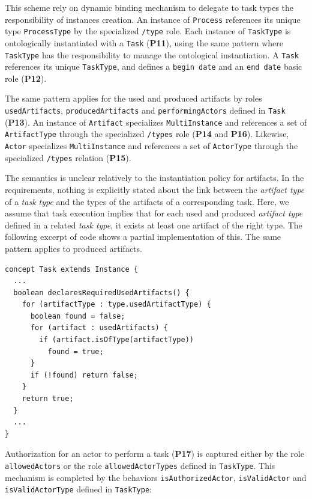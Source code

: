 This scheme rely on \FML dynamic binding mechanism to delegate to task types the responsibility of instances creation. An instance of \texttt{Process} references its unique type \texttt{ProcessType} by the specialized \texttt{/type} role. Each instance of \texttt{TaskType} is ontologically instantiated with a \texttt{Task} (\textbf{P11}), using the same pattern where \texttt{TaskType} has the responsibility to manage the ontological instantiation. A \texttt{Task} references its unique \texttt{TaskType}, and defines a \texttt{begin date} and an \texttt{end date} basic role (\textbf{P12}).

The same pattern applies for the used and produced artifacts by roles \texttt{usedArtifacts}, \texttt{producedArtifacts} and \texttt{performingActors} defined in \texttt{Task} (\textbf{P13}). An instance of \texttt{Artifact} specializes \texttt{MultiInstance} and references a set of \texttt{ArtifactType} through the specialized \texttt{/types} role (\textbf{P14} and \textbf{P16}). Likewise, \texttt{Actor} specializes \texttt{MultiInstance} and references a set of \texttt{ActorType} through the specialized \texttt{/types} relation (\textbf{P15}).

The semantics is unclear relatively to the instantiation policy for artifacts. In the requirements, nothing is explicitly stated about the link between the \emph{artifact type} of a \emph{task type} and the types of the artifacts of a corresponding task.
Here, we assume that task execution implies that for each used and produced \emph{artifact type} defined in a related \emph{task type}, it exists at least one artifact of the right type. The following excerpt of \FML code shows a partial implementation of this. The same pattern applies to produced artifacts.

\begin{lstlisting}
concept Task extends Instance {
  ...
  boolean declaresRequiredUsedArtifacts() {
    for (artifactType : type.usedArtifactType) {
      boolean found = false;
      for (artifact : usedArtifacts) {
        if (artifact.isOfType(artifactType))
          found = true;
      }
      if (!found) return false;
    }
    return true;
  }
  ...
}    
\end{lstlisting}

Authorization for an actor to perform a task (\textbf{P17}) is captured either by the role \texttt{allowedActors} or the role \texttt{allowedActorTypes} defined in \texttt{TaskType}. This mechanism is completed by the behaviors \texttt{isAuthorizedActor}, \texttt{isValidActor} and \texttt{isValidActorType} defined in \texttt{TaskType}: 

